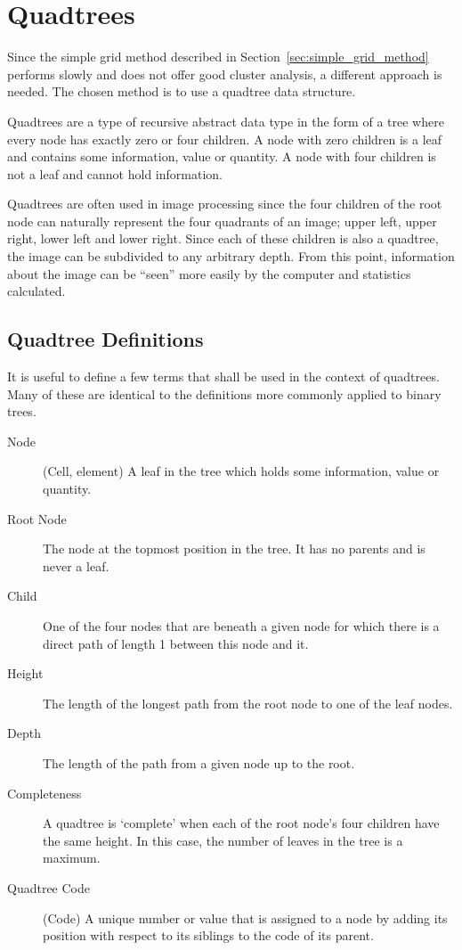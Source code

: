 
\section{Quadtrees}
\label{sec:quadtrees}

Since the simple grid method described in Section~\ref{sec:simple_grid_method}
performs slowly and does not offer good cluster analysis, a different approach
is needed. The chosen method is to use a quadtree data structure.

Quadtrees are a type of recursive abstract data type in the form of a tree
where every node has exactly zero or four children. A node with zero children
is a leaf and contains some information, value or quantity. A node with four
children is not a leaf and cannot hold information.

Quadtrees are often used in image processing since the four children of the
root node can naturally represent the four quadrants of an image; upper left,
upper right, lower left and lower right. Since each of these children is also a
quadtree, the image can be subdivided to any arbitrary depth. From this point,
information about the image can be ``seen'' more easily by the computer and
statistics calculated.

\subsection{Quadtree Definitions}
\label{sub:quadtree_definitions}

It is useful to define a few terms that shall be used in the context of
quadtrees. Many of these are identical to the definitions more commonly applied
to binary trees.

\begin{description}
	\item[Node] (Cell, element) A leaf in the tree which holds some
		information, value or quantity.
	\item[Root Node] The node at the topmost position in the tree. It has no
		parents and is never a leaf.
	\item[Child] One of the four nodes that are beneath a given node for which
		there is a direct path of length 1 between this node and it.
	\item[Height] The length of the longest path from the root node to one of
		the leaf nodes.
	\item[Depth] The length of the path from a given node up to the root.
	\item[Completeness] A quadtree is `complete' when each of the root node's
		four children have the same height. In this case, the number of leaves
		in the tree is a maximum.
	\item[Quadtree Code] (Code) A unique number or value that is assigned to a
		node by adding its position with respect to its siblings to the code of
		its parent.
\end{description}

